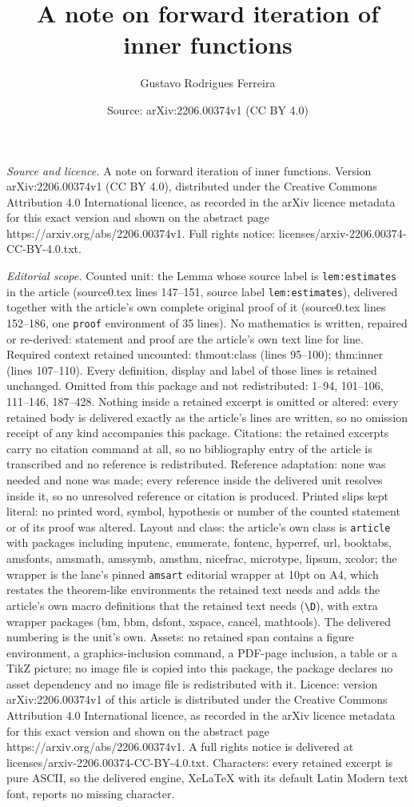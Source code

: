 \documentclass[10pt,a4paper]{amsart}
\title[A note on forward iteration of inner functions]{A note on forward iteration of inner functions}
\author{Gustavo Rodrigues Ferreira}
\date{Source: arXiv:2206.00374v1 (CC BY 4.0)}
\begin{document}
\maketitle

\noindent\emph{Source and licence.} A note on forward iteration of inner functions. Version arXiv:2206.00374v1 (CC BY 4.0), distributed under the Creative Commons Attribution 4.0 International licence, as recorded in the arXiv licence metadata for this exact version and shown on the abstract page https://arxiv.org/abs/2206.00374v1. Full rights notice: licenses/arxiv-2206.00374-CC-BY-4.0.txt.\par\smallskip

\noindent\textit{Editorial scope.} Counted unit: the Lemma whose source label is \texttt{lem:estimates} in the article (source0.tex lines 147--151, source label \texttt{lem:estimates}), delivered together with the article's own complete original proof of it (source0.tex lines 152--186, one \texttt{proof} environment of 35 lines). No mathematics is written, repaired or re-derived: statement and proof are the article's own text line for line. Required context retained uncounted: thmout:class (lines 95--100); thm:inner (lines 107--110). Every definition, display and label of those lines is retained unchanged. Omitted from this package and not redistributed: 1--94, 101--106, 111--146, 187--428. Nothing inside a retained excerpt is omitted or altered: every retained body is delivered exactly as the article's lines are written, so no omission receipt of any kind accompanies this package. Citations: the retained excerpts carry no citation command at all, so no bibliography entry of the article is transcribed and no reference is redistributed. Reference adaptation: none was needed and none was made; every reference inside the delivered unit resolves inside it, so no unresolved reference or citation is produced. Printed slips kept literal: no printed word, symbol, hypothesis or number of the counted statement or of its proof was altered. Layout and class: the article's own class is \texttt{article} with packages including inputenc, enumerate, fontenc, hyperref, url, booktabs, amsfonts, amsmath, amssymb, amsthm, nicefrac, microtype, lipsum, xcolor; the wrapper is the lane's pinned \texttt{amsart} editorial wrapper at 10pt on A4, which restates the theorem-like environments the retained text needs and adds the article's own macro definitions that the retained text needs (\texttt{\textbackslash D}), with extra wrapper packages (bm, bbm, dsfont, xspace, cancel, mathtools). The delivered numbering is the unit's own. Assets: no retained span contains a figure environment, a graphics-inclusion command, a PDF-page inclusion, a table or a TikZ picture; no image file is copied into this package, the package declares no asset dependency and no image file is redistributed with it. Licence: version arXiv:2206.00374v1 of this article is distributed under the Creative Commons Attribution 4.0 International licence, as recorded in the arXiv licence metadata for this exact version and shown on the abstract page https://arxiv.org/abs/2206.00374v1. A full rights notice is delivered at licenses/arxiv-2206.00374-CC-BY-4.0.txt. Characters: every retained excerpt is pure ASCII, so the delivered engine, XeLaTeX with its default Latin Modern text font, reports no missing character.
\end{document}
